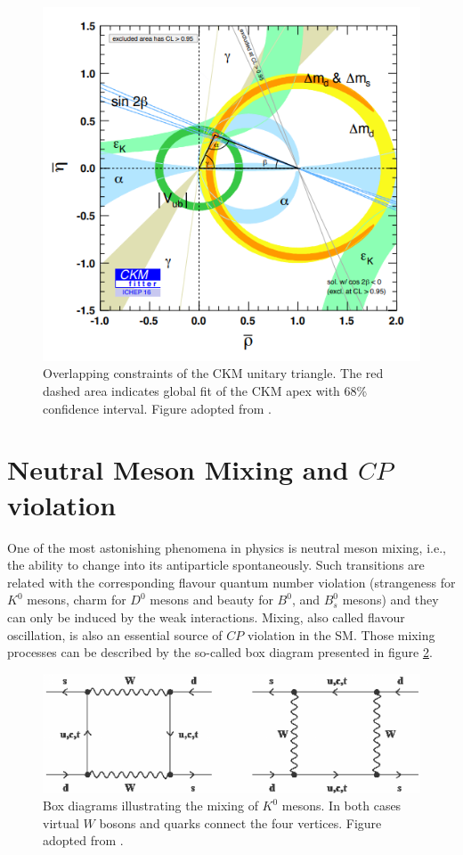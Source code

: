 \begin{figure}
\centering
\includegraphics[scale=0.6]{figures/Unitary_triangle_constrains.PNG}
\caption{Overlapping constraints of the CKM unitary triangle. The red dashed area indicates global fit of the CKM apex with 68\% confidence interval. Figure adopted from \cite{CKMFitter}.
\label{fig:triangle}}
\end{figure}


\section{Neutral Meson Mixing and $CP$ violation}

One of the most astonishing phenomena in physics is neutral meson mixing, i.e., the ability to change into its antiparticle spontaneously. Such transitions are related with the corresponding flavour quantum number violation (strangeness for $K^0$ mesons, charm for $D^0$ mesons and beauty for $B^0$, and $B^0_ s$ mesons) and they can only be induced by the weak interactions. Mixing, also called flavour oscillation, is also an essential source of $CP$ violation in the SM. Those mixing processes can be described by the so-called box diagram presented in figure \ref{fig:Mixinig}. 


\begin{figure}
\centering
\includegraphics[scale=0.9]{figures/Box-diagrams-depicting-K-0-K-0-mixing.png}
\caption{Box diagrams illustrating the mixing of $K^{0}$ mesons. In both cases virtual $W$ bosons
and quarks connect the four vertices. Figure adopted from \cite{Mixing}.
\label{fig:Mixinig}}
\end{figure}


